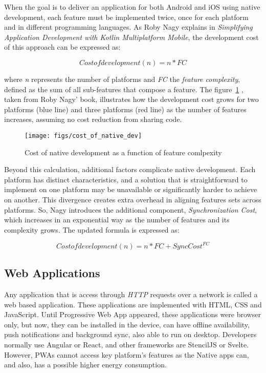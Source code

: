 When the goal is to deliver an application for both Android and iOS using native development, each feature must be implemented twice, once for each platform and in different programming languages.
As Roby Nagy explains in \textit{Simplifying Application Development with Kotlin Multiplatform Mobile}\cite{Nagy2022}, the development cost of this approach can be expressed as:


\[Cost of development (n) = n * FC\]

where \textit{n} represents the number of platforms and \textit{FC} the \textit{feature complexity}, defined as the sum of all sub-features that compose a feature.
The figure~\ref{fig:costNative} , taken from Roby Nagy' book\cite{Nagy2022}, illustrates how the development cost grows for two platforms (blue line) and three platforms (red line) as the number of features increases, assuming no cost reduction from sharing code.

\begin{figure}[h]
    \caption{Cost of native development as a function of feature comlpexity \cite{Nagy2022}}
    \centering
    \texttt{[image: figs/cost\_of\_native\_dev]}
    \label{fig:costNative}
\end{figure}


Beyond this calculation, additional factors complicate native development.
Each platform has distinct characteristics, and a solution that is straightforward to implement on one platform may be unavailable or significantly harder to achieve on another.
This divergence creates extra overhead in aligning features sets across platforms.
So, Nagy introduces the additional component, \textit{Synchronization Cost}, which increases in an exponential way as the number of features and its complexity grows.
The updated formula is expressed as:

\[Cost of development (n) = n * FC + Sync Cost ^ {FC}\]


\subsection{Web Applications}\label{subsec:web-applications}

Any application that is access through \textit{HTTP} requests over a network is called a web based application.
These applications are implemented with HTML, CSS and JavaScript.
Until Progressive Web App appeared, these applications were browser only, but now, they can be installed in the device, can have offline availability, push notifications and background sync, also able to run on desktop.
Developers normally use Angular or React, and other frameworks are StencilJS or Svelte.
However, PWAs cannot access key platform's features as the Native apps can, and also, has a possible higher energy consumption.\cite{Huber2021}


